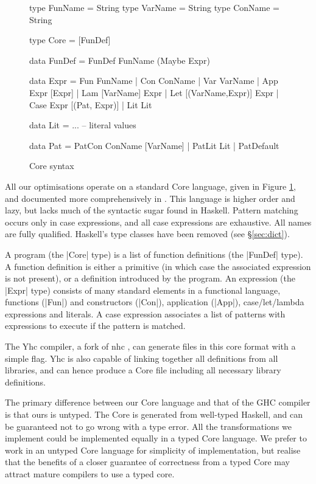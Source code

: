\documentclass{llncs}
\begin{document}
\begin{figure}
\begin{code}
type FunName  = String
type VarName  = String
type ConName  = String

type Core = [FunDef]

data FunDef  =  FunDef FunName (Maybe Expr)

data Expr  =  Fun   FunName
           |  Con   ConName
           |  Var   VarName
           |  App   Expr [Expr]
           |  Lam   [VarName] Expr
           |  Let   [(VarName,Expr)] Expr
           |  Case  Expr [(Pat, Expr)]
           |  Lit   Lit

data Lit = ... -- literal values

data Pat  =  PatCon  ConName [VarName]
          |  PatLit  Lit
          |  PatDefault
\end{code}
\caption{Core syntax}
\label{fig:core}
\end{figure}

All our optimisations operate on a standard Core language, given in Figure \ref{fig:core}, and documented more comprehensively in \cite{me:yhc_core}. This language is higher order and lazy, but lacks much of the syntactic sugar found in Haskell. Pattern matching occurs only in case expressions, and all case expressions are exhaustive. All names are fully qualified. Haskell's type classes have been removed (see \S\ref{sec:dict}).

A program (the |Core| type) is a list of function definitions (the |FunDef| type). A function definition is either a primitive (in which case the associated expression is not present), or a definition introduced by the program. An expression (the |Expr| type) consists of many standard elements in a functional language, functions (|Fun|) and constructors (|Con|), application (|App|), case/let/lambda expressions and literals. A case expression associates a list of patterns with expressions to execute if the pattern is matched.

The Yhc compiler, a fork of nhc \cite{nhc}, can generate files in this core format with a simple flag. Yhc is also capable of linking together all definitions from all libraries, and can hence produce a Core file including all necessary library definitions.

The primary difference between our Core language and that of the GHC compiler is that ours is untyped. The Core is generated from well-typed Haskell, and can be guaranteed not to go wrong with a type error. All the transformations we implement could be implemented equally in a typed Core language. We prefer to work in an untyped Core language for simplicity of implementation, but realise that the benefits of a closer guarantee of correctness from a typed Core may attract mature compilers to use a typed core.
\end{document}
